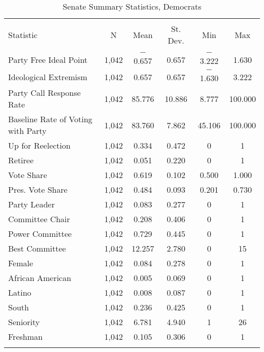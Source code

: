 \documentclass[12pt]{article}
\begin{document}
\begin{table}[H] 
	\centering 
	\singlespacing
	\caption{Senate Summary Statistics, Democrats} 
	\label{} 
	\begin{tabular}{@{\extracolsep{5pt}}lccccc} 
		\\[-1.8ex]\hline 
		\hline \\[-1.8ex] 
		Statistic & \multicolumn{1}{c}{N} & \multicolumn{1}{c}{Mean} & \multicolumn{1}{c}{St. Dev.} & \multicolumn{1}{c}{Min} & \multicolumn{1}{c}{Max} \\ 
		\hline \\[-1.8ex]  
		Party Free Ideal Point & 1,042 & $-$0.657 & 0.657 & $-$3.222 & 1.630 \\ 
		Ideological Extremism & 1,042 & 0.657 & 0.657 & $-$1.630 & 3.222 \\ 
		Party Call Response Rate & 1,042 & 85.776 & 10.886 & 8.777 & 100.000 \\ 
		Baseline Rate of Voting with Party & 1,042 & 83.760 & 7.862 & 45.106 & 100.000 \\
		Up for Reelection & 1,042 & 0.334 & 0.472 & 0 & 1 \\ 
		Retiree & 1,042 & 0.051 & 0.220 & 0 & 1 \\ 
		Vote Share & 1,042 & 0.619 & 0.102 & 0.500 & 1.000 \\ 
		Pres. Vote Share & 1,042 & 0.484 & 0.093 & 0.201 & 0.730 \\ 
		Party Leader & 1,042 & 0.083 & 0.277 & 0 & 1 \\ 
		Committee Chair & 1,042 & 0.208 & 0.406 & 0 & 1 \\ 
		Power Committee & 1,042 & 0.729 & 0.445 & 0 & 1 \\ 
		Best Committee & 1,042 & 12.257 & 2.780 & 0 & 15 \\ 
		Female & 1,042 & 0.084 & 0.278 & 0 & 1 \\ 
		African American & 1,042 & 0.005 & 0.069 & 0 & 1 \\ 
		Latino & 1,042 & 0.008 & 0.087 & 0 & 1 \\ 
		South & 1,042 & 0.236 & 0.425 & 0 & 1 \\ 
		Seniority & 1,042 & 6.781 & 4.940 & 1 & 26 \\ 
		Freshman & 1,042 & 0.105 & 0.306 & 0 & 1 \\  
		\hline \\[-1.8ex] 
	\end{tabular} 
\end{table} 
\end{document}
